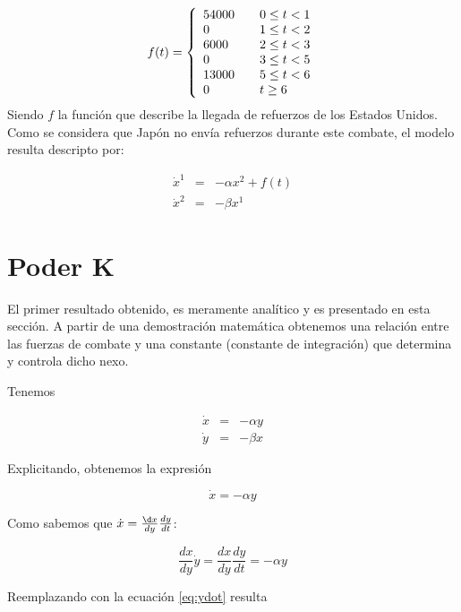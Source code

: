 \documentclass{sig-alternate}
\begin{document}
\begin{equation}
f(t) = \left\{ 
    \begin{array}{l l}
    54000 & \quad 0 \leq t < 1 \\
    0 & \quad 1 \leq t < 2\\
    6000 & \quad 2 \leq t < 3\\
    0 & \quad 3 \leq t < 5\\
    13000 & \quad 5 \leq t < 6\\
    0 & \quad t \geq 6\\
    \end{array} \right.
\end{equation}
Siendo $f$ la función que describe la llegada de refuerzos de los Estados Unidos. Como se considera que Japón no envía refuerzos durante este
combate, el modelo resulta descripto por:


\begin{eqnarray}
\dot{x}^1 &=& -\alpha x^2 + f(t)                              \\
\dot{x}^2 &=& -\beta x^1
\end{eqnarray}


\section{Poder K}

El primer resultado obtenido, es meramente analítico y es presentado en esta sección. A partir de una demostración matemática
obtenemos una relación entre las fuerzas de combate y una constante (constante de integración) que determina y controla dicho nexo. 

Tenemos

\begin{eqnarray}
\dot{x} & = & -\alpha y\label{eq:ydot}\\
\dot{y} & = & -\beta x\end{eqnarray}


Explicitando, obtenemos la expresión

\begin{equation}
\dot{x}=-\alpha y\end{equation}


Como sabemos que $\dot{x}=\frac{\d x}{d y}\frac{d y}{d t}$:

\begin{equation}
\frac{d x}{d y}\dot{y}=\frac{d x}{d y}\frac{d y}{d t}=-\alpha y\end{equation}


Reemplazando con la ecuación \eqref{eq:ydot} resulta
\end{document}
